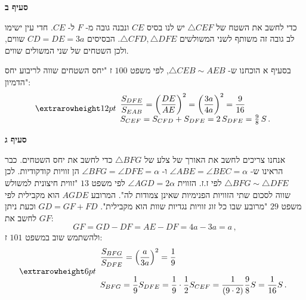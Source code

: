 \np

\textbf{סעיף ב}

כדי לחשב את השטח של 
$\triangle CEF$
יש לנו בסיס
$CE$
ונבנה גובה מ-%
$F$
ל-%
$CE$.
חדי עין ישימו לב גובה זה משותף לשני המשולשים
$\triangle CFD,\triangle DFE$.
הבסיסים
$CD=DE=3a$
שווים, ולכן השטחים של שני המשולים שווים.

בסעיף א הוכחנו ש-%
$\triangle CEB\sim AEB$,
לפי משפט
$100$%
ז "יחס השטחים שווה לריבוע יחס הדמיון":
\[
\erh{12pt}
\begin{array}{l}
\displaystyle\frac{S_{DFE}}{S_{EAB}}= \left(\frac{DE}{AE}\right)^2= \left(\frac{3a}{4a}\right)^2=\frac{9}{16}\\
S_{CEF} = S_{CFD}+S_{DFE}=2 \, S_{DFE}= \frac{9}{8}\, S\,.
\end{array}
\]

\textbf{סעיף ג}

אנחנו צריכים לחשב את האורך של צלע של
$\triangle BFG$
כדי לחשב את יחס השטחים. כבר הראינו ש-%
$\angle ABE = \angle BEC=\alpha$
ו-%
$\angle BFG = \angle DFE=\alpha$
הן זוויות קודקודיות. לכן
$\triangle BFG \sim \triangle DFE$
לפי ז.ז. הזווית
$\angle AGD=2\alpha$
לפי משפט
$13$
"זווית חיצונית למשולש שווה לסכום שתי הזוויות הפנימיות שאינן צמודות לה". המרובע
$AGDE$
הוא מקבילית לפי משפט
$29$
"מרובע שבו כל זוג זוויות נגדיות שוות הוא מקבילית". 
$GD=GF+FD$
וכעת ניתן לחשב את
$GF$:
\[
GF=GD-DF=AE-DF=4a-3a=a\,,
\]
ולהשתמש שוב במשפט
$101$%
ז:
\[
\erh{6pt}
\begin{array}{l}
\displaystyle\frac{S_{BFG}}{S_{DFE}}=\left(\frac{a}{3a}\right)^2=\frac{1}{9}\\\\
\displaystyle S_{BFG}=\frac{1}{9}S_{DFE}=\frac{1}{9}\cdot\frac{1}{2}S_{CEF}=\frac{1}{(9\cdot 2)}\frac{9}{8}S=\frac{1}{16}S\,.
\end{array}
\]

\vspace{-10ex}


